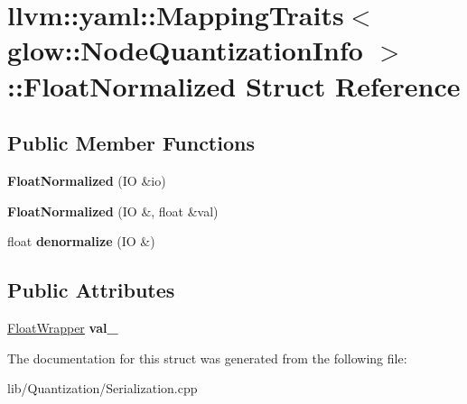 \hypertarget{structllvm_1_1yaml_1_1_mapping_traits_3_01glow_1_1_node_quantization_info_01_4_1_1_float_normalized}{}\section{llvm\+:\+:yaml\+:\+:Mapping\+Traits$<$ glow\+:\+:Node\+Quantization\+Info $>$\+:\+:Float\+Normalized Struct Reference}
\label{structllvm_1_1yaml_1_1_mapping_traits_3_01glow_1_1_node_quantization_info_01_4_1_1_float_normalized}
\subsection*{Public Member Functions}
\begin{DoxyCompactItemize}
\item 
\mbox{\label{structllvm_1_1yaml_1_1_mapping_traits_3_01glow_1_1_node_quantization_info_01_4_1_1_float_normalized_a6770a1389018011a917bd50349551bb0}} 
{\bfseries Float\+Normalized} (IO \&io)
\item 
\mbox{\label{structllvm_1_1yaml_1_1_mapping_traits_3_01glow_1_1_node_quantization_info_01_4_1_1_float_normalized_ad45a6cc6de4ef5628dcf35af54b8ef45}} 
{\bfseries Float\+Normalized} (IO \&, float \&val)
\item 
\mbox{\label{structllvm_1_1yaml_1_1_mapping_traits_3_01glow_1_1_node_quantization_info_01_4_1_1_float_normalized_a8996a3dbcc1b2482d14f02837be82b19}} 
float {\bfseries denormalize} (IO \&)
\end{DoxyCompactItemize}
\subsection*{Public Attributes}
\begin{DoxyCompactItemize}
\item 
\mbox{\label{structllvm_1_1yaml_1_1_mapping_traits_3_01glow_1_1_node_quantization_info_01_4_1_1_float_normalized_acaec4a3bc082037ced8540dd68b5cf36}} 
\hyperlink{structllvm_1_1yaml_1_1_float_wrapper}{Float\+Wrapper} {\bfseries val\+\_\+}
\end{DoxyCompactItemize}


The documentation for this struct was generated from the following file\+:\begin{DoxyCompactItemize}
\item 
lib/\+Quantization/Serialization.\+cpp\end{DoxyCompactItemize}
